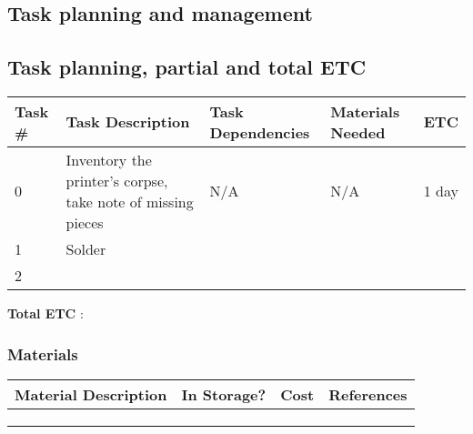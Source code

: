 \documentclass[a4paper,12pt]{article}
\begin{document}
		\subsection{Task planning and management}
			\subsection{Task planning, partial and total ETC}
		
		\begin{table}[h]
			\begin{tabular}{lllll}
				\hline
				Task \# & Task Description & Task Dependencies & Materials Needed & ETC \\ \hline
        			0 & Inventory the printer's corpse, take note of missing pieces & N/A & N/A & 1 day \\
        			1 & Solder &                   &                  &     \\
				2 & &                   &                  &     \\ \hline
			\end{tabular}
		\end{table}
		\textbf{Total ETC} : %
		\subsubsection{Materials}
		\begin{table}[h]
			\begin{tabular}{llll}
			\hline
			Material Description & In Storage? & Cost & References \\ \hline
                     	&             &      &            \\
                     	&             &      &            \\
                     	&             &      &            \\ \hline
			\end{tabular}
		\end{table}
\end{document}
